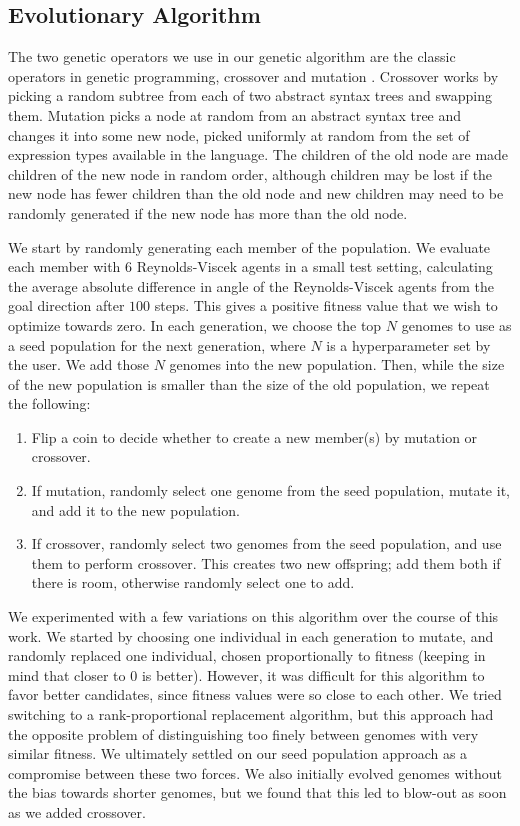\subsection{Evolutionary Algorithm}
\label{sec:evolutionaryalg}
The two genetic operators we use in our genetic algorithm are the classic
operators in genetic programming, crossover and mutation \cite{deCastro2007}.
Crossover works by picking a random subtree from each of two abstract syntax
trees and swapping them.
Mutation picks a node at random from an abstract syntax tree and changes it
into some new node, picked uniformly at random from the set of expression types
available in the language.
The children of the old node are made children of the new node in random order,
although children may be lost if the new node has fewer children than the old
node and new children may need to be randomly generated if the new node has
more than the old node.

We start by randomly generating each member of the population.
We evaluate each member with $6$ Reynolds-Viscek agents in a small test setting,
calculating the average absolute difference in angle of the Reynolds-Viscek
agents from the goal direction after $100$ steps.
This gives a positive fitness value that we wish to optimize towards zero.
In each generation, we choose the top $N$ genomes to use as a seed population
for the next generation, where $N$ is a hyperparameter set by the user.
We add those $N$ genomes into the new population.
Then, while the size of the new population is smaller than the size of the
old population, we repeat the following:
\begin{enumerate}
    \item Flip a coin to decide whether to create a new member(s) by mutation
    or crossover.
    \item If mutation, randomly select one genome from the seed population,
    mutate it, and add it to the new population.
    \item If crossover, randomly select two genomes from the seed population,
    and use them to perform crossover.
    This creates two new offspring; add them both if there is room, otherwise
    randomly select one to add.
\end{enumerate}

We experimented with a few variations on this algorithm over the course of this
work.
We started by choosing one individual in each generation to mutate, and randomly
replaced one individual, chosen proportionally to fitness (keeping in mind that
closer to $0$ is better).
However, it was difficult for this algorithm to favor better candidates, since
fitness values were so close to each other.
We tried switching to a rank-proportional replacement algorithm, but this
approach had the opposite problem of distinguishing too finely between genomes
with very similar fitness.
We ultimately settled on our seed population approach as a compromise between
these two forces.
We also initially evolved genomes without the bias towards shorter genomes,
but we found that this led to blow-out as soon as we added crossover.

